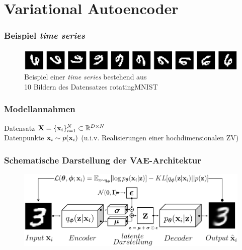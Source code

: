 

\author[Jannis Klingler]{Nix}


\beamertemplatenavigationsymbolsempty{}




\section{Variational Autoencoder}

\begin{frame}
	\frametitle{Beispiel \emph{time series}}
	\begin{figure}[!htbp]
		\includegraphics[scale=0.25]{Bilder/rotatingMNIST}
		\caption{Beispiel einer \emph{time series} bestehend aus \\10 Bildern des Datensatzes rotatingMNIST}
	\end{figure}
\end{frame}

\begin{frame}
	\frametitle{Modellannahmen}
	Datensatz $\textbf{X} = \lbrace\mathbf{x}_i \rbrace_{i=1}^{N} \subset \mathbb{R}^{D\times N}$\\
	Datenpunkte $\mathbf{x}_i\sim p(\mathbf{x}_i)$ (u.i.v. Realisierungen einer hochdimensionalen ZV)
\end{frame}

\begin{frame}
	\frametitle{Schematische Darstellung der VAE-Architektur}
	\begin{figure}[htbp!]
		\includegraphics[scale=0.27]{Bilder/VAE-Modell.PNG}
	\end{figure}
\end{frame}